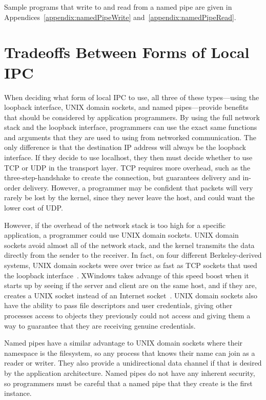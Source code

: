 Sample programs that write to and read from a named pipe are given in Appendices~\ref{appendix:namedPipeWrite} and~\ref{appendix:namedPipeRead}.

\section{Tradeoffs Between Forms of Local IPC}
\label{sec:localIPCTradeoffs}
When deciding what form of local IPC to use, all three of these types---using the loopback interface, UNIX domain sockets, and named pipes---provide benefits that should be considered by application programmers.  By using the full network stack and the loopback interface, programmers can use the exact same functions and arguments that they are used to using from networked communication.  The only difference is that the destination IP address will always be the loopback interface.  If they decide to use localhost, they then must decide whether to use TCP or UDP in the transport layer.  TCP requires more overhead, such as the three-step-handshake to create the connection, but guarantees delivery and in-order delivery.  However, a programmer may be confident that packets will very rarely be lost by the kernel, since they never leave the host, and could want the lower cost of UDP.

However, if the overhead of the network stack is too high for a specific application, a programmer could use UNIX domain sockets.  UNIX domain sockets avoid almost all of the network stack, and the kernel transmits the data directly from the sender to the receiver.  In fact, on four different Berkeley-derived systems, UNIX domain sockets were over twice as fast as TCP sockets that used the loopback interface~\cite[p 223--224]{Stevens:1997:UNP:522800}.  XWindows takes advange of this speed boost when it starts up by seeing if the server and client are on the same host, and if they are, creates a UNIX socket instead of an Internet socket~\cite[p 373]{Stevens:1997:UNP:522800}.  UNIX domain sockets also have the ability to pass file descriptors and user credentials, giving other processes access to objects they previously could not access and giving them a way to guarantee that they are receiving genuine credentials.

Named pipes have a similar advantage to UNIX domain sockets where their namespace is the filesystem, so any process that knows their name can join as a reader or writer.  They also provide a unidirectional data channel if that is desired by the application architecture.  Named pipes do not have any inherent security, so programmers must be careful that a named pipe that they create is the first instance.

